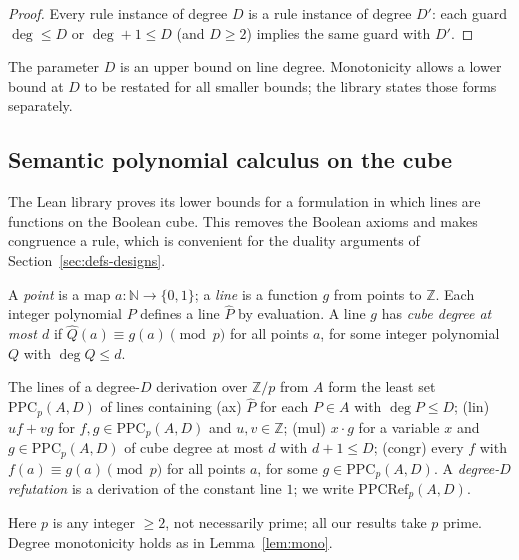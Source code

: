 \begin{proof}
Every rule instance of degree $D$ is a rule instance of degree $D'$: each guard
$\deg\le D$ or $\deg+1\le D$ (and $D\ge2$) implies the same guard with $D'$.
\end{proof}

The parameter $D$ is an upper bound on line degree.  Monotonicity allows a lower bound
at $D$ to be restated for all smaller bounds; the library states those forms
separately.

\subsection{Semantic polynomial calculus on the cube}\label{sec:defs-sem}

The Lean library proves its lower bounds for a formulation in which lines are functions on
the Boolean cube.  This removes the Boolean axioms and makes congruence a rule, which is
convenient for the duality arguments of Section~\ref{sec:defs-designs}.

A \emph{point} is a map $a\colon\mathbb N\to\{0,1\}$; a \emph{line} is a function
$g$ from points to $\mathbb Z$.  Each integer polynomial $P$ defines a line $\hat P$ by
evaluation.  A line $g$ has \emph{cube degree at most $d$} if $\hat Q(a)\equiv g(a)\pmod p$
for all points $a$, for some integer polynomial $Q$ with $\deg Q\le d$.

\begin{definition}[semantic PC]\label{def:ppc}
The lines of a degree-$D$ derivation over $\mathbb Z/p$ from $A$ form the least set
$\mathrm{PPC}_p(A,D)$ of lines containing
(ax) $\hat P$ for each $P\in A$ with $\deg P\le D$;
(lin) $uf+vg$ for $f,g\in\mathrm{PPC}_p(A,D)$ and $u,v\in\mathbb Z$;
(mul) $x\cdot g$ for a variable $x$ and $g\in\mathrm{PPC}_p(A,D)$ of cube degree at most
$d$ with $d+1\le D$;
(congr) every $f$ with $f(a)\equiv g(a)\pmod p$ for all points $a$, for some
$g\in\mathrm{PPC}_p(A,D)$.
A \emph{degree-$D$ refutation} is a derivation of the constant line $1$; we write
$\mathrm{PPCRef}_p(A,D)$.
\end{definition}

Here $p$ is any integer $\ge2$, not necessarily prime; all our results take $p$ prime.
Degree monotonicity holds as in Lemma~\ref{lem:mono}.

